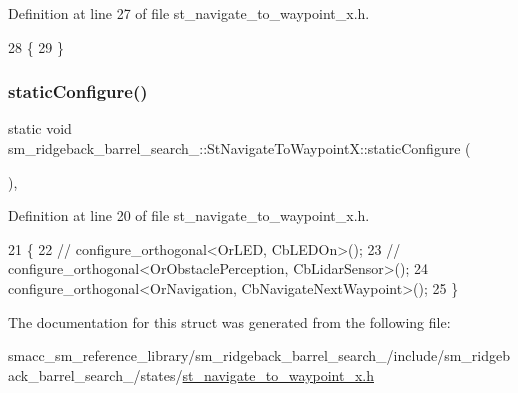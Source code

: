Definition at line 27 of file st\+\_\+navigate\+\_\+to\+\_\+waypoint\+\_\+x.\+h.


\begin{DoxyCode}
28         \{
29         \}
\end{DoxyCode}
\mbox{\label{structsm__ridgeback__barrel__search__1_1_1StNavigateToWaypointX_a42eefeafb5e4bf22315e1e99b240dcf2}} 
\subsubsection{\texorpdfstring{static\+Configure()}{staticConfigure()}}
{\footnotesize\ttfamily static void sm\+\_\+ridgeback\+\_\+barrel\+\_\+search\+\_\+::\+St\+Navigate\+To\+Waypoint\+X\+::static\+Configure (\begin{DoxyParamCaption}{ }\end{DoxyParamCaption})\hspace{0.3cm}{\ttfamily [inline]}, {\ttfamily [static]}}



Definition at line 20 of file st\+\_\+navigate\+\_\+to\+\_\+waypoint\+\_\+x.\+h.


\begin{DoxyCode}
21         \{
22             \textcolor{comment}{// configure\_orthogonal<OrLED, CbLEDOn>();}
23             \textcolor{comment}{// configure\_orthogonal<OrObstaclePerception, CbLidarSensor>();}
24             configure\_orthogonal<OrNavigation, CbNavigateNextWaypoint>();
25         \}
\end{DoxyCode}


The documentation for this struct was generated from the following file\+:\begin{DoxyCompactItemize}
\item 
smacc\+\_\+sm\+\_\+reference\+\_\+library/sm\+\_\+ridgeback\+\_\+barrel\+\_\+search\+\_/include/sm\+\_\+ridgeback\+\_\+barrel\+\_\+search\+\_/states/\hyperlink{sm__ridgeback__barrel__search__1_2include_2sm__ridgeback__barrel__search__1_2states_2st__navigate__to__waypoint__x_8h}{st\+\_\+navigate\+\_\+to\+\_\+waypoint\+\_\+x.\+h}\end{DoxyCompactItemize}
